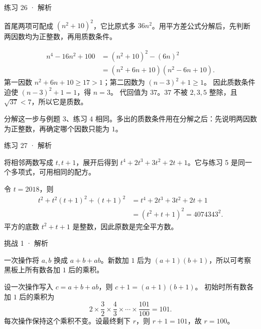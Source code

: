 


\begin{solution}[before skip=4pt plus 1pt,after skip=4pt plus 1pt,top=6pt,bottom=6pt]{练习 26 · 解析}

\think 首尾两项可配成 $(n^2+10)^2$，它比原式多 $36n^2$。用平方差公式分解后，先判断两因数均为正整数，再用质数条件。

\solve \begin{align*}
n^4-16n^2+100&=(n^2+10)^2-(6n)^2\\
&=(n^2+6n+10)(n^2-6n+10).
\end{align*}
第一因数 $n^2+6n+10\ge17>1$；第二因数为 $(n-3)^2+1\ge1$。
因此质数条件迫使 $(n-3)^2+1=1$，得 $n=3$。
代回值为 $37$。$37$ 不被 $2,3,5$ 整除，且 $\sqrt{37}<7$，所以它是质数。

分解这一步与例题 3、练习 4 相同。多出的质数条件用在分解之后：先说明两因数为正整数，再确定哪个因数只能为 $1$。


\end{solution}


\begin{solution}[before skip=4pt plus 1pt,after skip=4pt plus 1pt,top=6pt,bottom=6pt]{练习 27 · 解析}

\think 将相邻两数写成 $t,t+1$，展开后得到 $t^4+2t^3+3t^2+2t+1$。它与练习 5 是同一个多项式，可用相同的配方。

\solve 令 $t=2018$，则
\begin{align*}
t^2+t^2(t+1)^2+(t+1)^2&=t^4+2t^3+3t^2+2t+1\\
&=(t^2+t+1)^2=4074343^2.
\end{align*}
平方的底数 $t^2+t+1$ 是整数，因此原数是完全平方数。


\end{solution}




\begin{solution}[before skip=4pt plus 1pt,after skip=4pt plus 1pt,top=6pt,bottom=6pt]{挑战 1 · 解析}

\think 一次操作将 $a,b$ 换成 $a+b+ab$。新数加 $1$ 后为 $(a+1)(b+1)$，所以可考察黑板上所有数各加 $1$ 后的乘积。

\solve 设一次操作写入 $c=a+b+ab$，则 $c+1=(a+1)(b+1)$。
初始时所有数各加 $1$ 后的乘积为
\[2\times\frac32\times\frac43\times\cdots\times\frac{101}{100}=101.\]
每次操作保持这个乘积不变。设最终剩下 $r$，则 $r+1=101$，故 $r=100$。


\end{solution}

